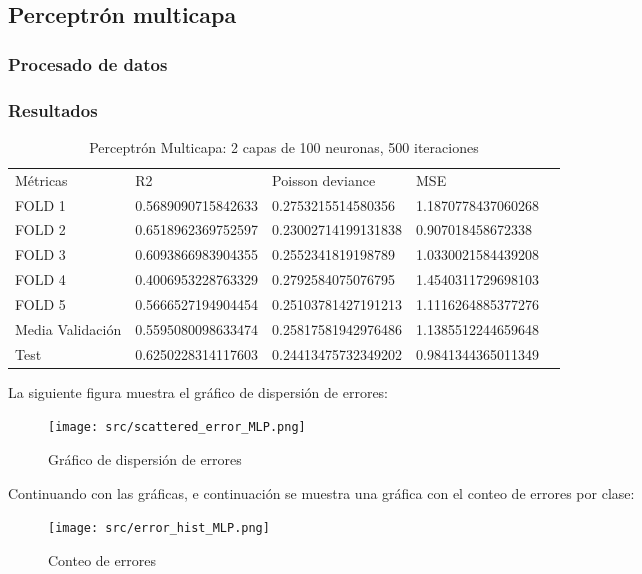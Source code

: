 \subsection{Perceptrón multicapa}
\subsubsection{Procesado de datos}
\subsubsection{Resultados}
\begin{table}[htbp]
	\begin{tabular}{|l|l|l|l|l}
		\cline{1-4}
		Métricas & R2                 & Poisson deviance    & MSE                \\ \cline{1-4}
		FOLD 1   & 0.5689090715842633 & 0.2753215514580356  & 1.1870778437060268 \\ \cline{1-4}
		FOLD 2   & 0.6518962369752597 & 0.23002714199131838 & 0.907018458672338  \\ \cline{1-4}
		FOLD 3   & 0.6093866983904355 & 0.2552341819198789  & 1.0330021584439208 \\ \cline{1-4}
		FOLD 4   & 0.4006953228763329 & 0.2792584075076795  & 1.4540311729698103 \\ \cline{1-4}
		FOLD 5   & 0.5666527194904454 & 0.25103781427191213 & 1.1116264885377276 \\ \cline{1-4}
		Media Validación    & 0.5595080098633474 & 0.25817581942976486 & 1.1385512244659648 \\ \cline{1-4}
		Test	 & 0.6250228314117603 & 0.24413475732349202 & 0.9841344365011349 \\ \cline{1-4}
	\end{tabular}
	\caption{Perceptrón Multicapa: 2 capas de 100 neuronas, 500 iteraciones}
	\label{tab:mlp_res}
\end{table}
La siguiente figura muestra el gráfico de dispersión de errores:
\begin{figure}[H]
	\centering
	\texttt{[image: src/scattered\_error\_MLP.png]}
	\caption{Gráfico de dispersión de errores}
	\label{fig:mlp_scattered}
\end{figure}
Continuando con las gráficas, e continuación se muestra una gráfica con el conteo de errores por clase:\\
\linebreak
\begin{figure}[H]
	\centering
	\texttt{[image: src/error\_hist\_MLP.png]}
	\caption{Conteo de errores}
	\label{fig:mlp_error_plot}
\end{figure}
